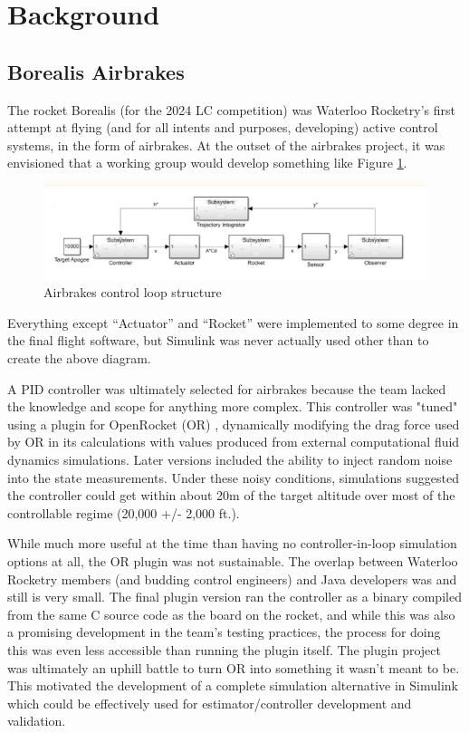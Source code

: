 \section{Background}

\subsection{Borealis Airbrakes}
\label{test}
The rocket Borealis (for the 2024 LC competition) was Waterloo Rocketry's first attempt at flying (and for all intents and purposes, developing) active control systems, in the form of airbrakes. At the outset of the airbrakes project, it was envisioned that a working group would develop something like Figure \ref{fig:ab-model}.

\begin{figure}[ht]
    \centering
    \includegraphics[width=0.8\linewidth]{images-plant/airbrakes.png}
    \caption{Airbrakes control loop structure}
    \label{fig:ab-model}
\end{figure}

Everything except ``Actuator'' and ``Rocket'' were implemented to some degree in the final flight software, but Simulink was never actually used other than to create the above diagram.

A PID controller was ultimately selected for airbrakes because the team lacked the knowledge and scope for anything more complex. This controller was "tuned" using a plugin for OpenRocket (OR) \cite{or-brake}, dynamically modifying the drag force used by OR in its calculations with values produced from external computational fluid dynamics simulations. Later versions included the ability to inject random noise into the state measurements. Under these noisy conditions, simulations suggested the controller could get within about 20m of the target altitude over most of the controllable regime (20,000 +/- 2,000 ft.). 

While much more useful at the time than having no controller-in-loop simulation options at all, the OR plugin was not sustainable. The overlap between Waterloo Rocketry members (and budding control engineers) and Java developers was and still is very small. The final plugin version ran the controller as a binary compiled from the same C source code as the board on the rocket, and while this was also a promising development in the team's testing practices, the process for doing this was even less accessible than running the plugin itself. The plugin project was ultimately an uphill battle to turn OR into something it wasn't meant to be. This motivated the development of a complete simulation alternative in Simulink which could be effectively used for estimator/controller development and validation.


